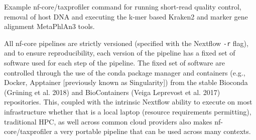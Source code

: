\documentclass[
]{article}
\newenvironment{Shaded}{}{}
\newcommand{\AttributeTok}[1]{\textcolor[rgb]{0.84,0.23,0.29}{#1}}
\newcommand{\DataTypeTok}[1]{\textcolor[rgb]{0.84,0.23,0.29}{#1}}
\newcommand{\ExtensionTok}[1]{\textcolor[rgb]{0.84,0.23,0.29}{\textbf{#1}}}
\newcommand{\NormalTok}[1]{\textcolor[rgb]{0.14,0.16,0.18}{#1}}
\newcommand{\OperatorTok}[1]{\textcolor[rgb]{0.14,0.16,0.18}{#1}}
\newcommand{\StringTok}[1]{\textcolor[rgb]{0.01,0.18,0.38}{#1}}
\begin{document}
\begin{codelisting}

\caption{Example nf-core/taxprofiler command for running short-read
quality control, removal of host DNA and executing the k-mer based
Kraken2 and marker gene alignment MetaPhlAn3 tools.}

\hypertarget{lst-example-cmd}{%
\label{lst-example-cmd}}%
\begin{Shaded}
\end{Shaded}

\end{codelisting}

All nf-core pipelines are strictly versioned (specified with the
Nextflow \texttt{-r} flag), and to ensure reproducibility, each version
of the pipeline has a fixed set of software used for each step of the
pipeline. The fixed set of software are controlled through the use of
the conda package manager and containers (e.g., Docker, Apptainer
{[}previously known as Singularity{]}) from the stable Bioconda (Grüning
et al. 2018) and BioContainers (Veiga Leprevost et al. 2017)
repositories. This, coupled with the intrinsic Nextflow ability to
execute on most infrastructure whether that is a local laptop (resource
requirements permitting), traditional HPC, as well across common cloud
providers also makes nf-core/taxprofiler a very portable pipeline that
can be used across many contexts.
\end{document}
